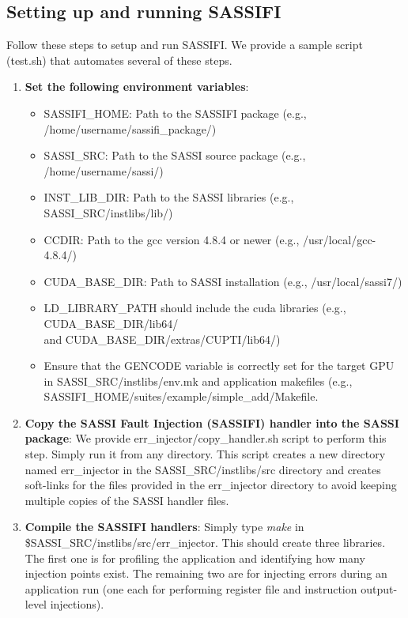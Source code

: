 \subsection{Setting up and running SASSIFI}

Follow these steps to setup and run SASSIFI. We provide a sample script (test.sh) that automates several of these steps.

\begin{enumerate}

\item {\bf Set the following environment variables}:
	\begin{itemize}
		\item SASSIFI\_HOME: Path to the SASSIFI package (e.g., /home/username/sassifi\_package/)
		\item SASSI\_SRC: Path to the SASSI source package (e.g., /home/username/sassi/)
		\item INST\_LIB\_DIR: Path to the SASSI libraries (e.g., SASSI\_SRC/instlibs/lib/)
		\item CCDIR: Path to the gcc version 4.8.4 or newer (e.g., /usr/local/gcc-4.8.4/)
		\item CUDA\_BASE\_DIR: Path to SASSI installation (e.g., /usr/local/sassi7/)
		\item LD\_LIBRARY\_PATH should include the cuda libraries (e.g., CUDA\_BASE\_DIR/lib64/  \\
		and CUDA\_BASE\_DIR/extras/CUPTI/lib64/)
		\item Ensure that the GENCODE variable is correctly set for the target GPU
		in SASSI\_SRC/instlibs/env.mk and application makefiles (e.g.,
		SASSIFI\_HOME/suites/example/simple\_add/Makefile. 
		\end{itemize}
\label{step1}

\item {\bf Copy the SASSI Fault Injection (SASSIFI) handler into the SASSI package}:
		 We provide err\_injector/copy\_handler.sh script to perform this step.
		 Simply run it from any directory. This script creates a new directory
		 named err\_injector in the SASSI\_SRC/instlibs/src directory and creates
		 soft-links for the files provided in the err\_injector directory to avoid
		 keeping multiple copies of the SASSI handler files.
\label{step2}

\item {\bf Compile the SASSIFI handlers}:
		Simply type {\em make} in \$SASSI\_SRC/instlibs/src/err\_injector.  This should
		create three libraries. The first one is for profiling the application and
		identifying how many injection points exist. The remaining two are for
		injecting errors during an application run (one each for performing
		register file and instruction output-level injections).
\label{step3}


\end{enumerate}
